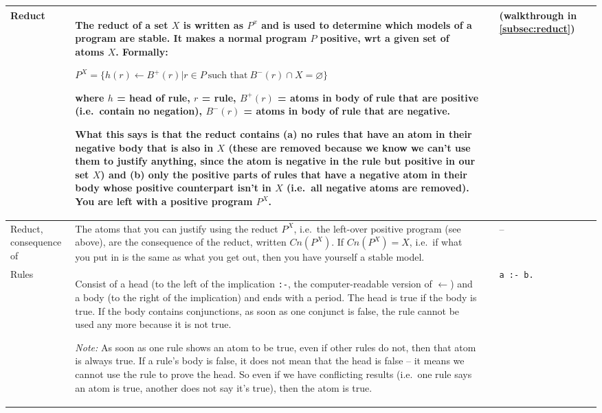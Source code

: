 \documentclass[9pt,a4paper,landscape]{article}
\begin{document}
{\begin{longtable}{Lp{14.5cm}lXX}
Reduct
& The reduct of a set $X$ is written as $P^x$ and is used to determine which models of a program are stable.
It makes a normal program $P$ positive, wrt a given set of atoms $X$.
Formally:
\begin{center}
	$P^X = \{h(r) \leftarrow B^+(r) | r \in P\ \text{such that}\ B^-(r) \cap X = \varnothing \}$
\end{center}
where $h$ = head of rule, $r$ = rule, $B^+(r)$ = atoms in body of rule that are positive (i.e.\ contain no negation), $B^-(r)$ = atoms in body of rule that are negative. \newline

What this says is that the reduct contains (a) no rules that have an atom in their negative body that is also in $X$ (these are removed because we know we can't use them to justify anything, since the atom is negative in the rule but positive in our set $X$) and (b) only the positive parts of rules that have a negative atom in their body whose positive counterpart isn't in $X$ (i.e.\ all negative atoms are removed).
You are left with a positive program $P^X$. \newline

&& (walkthrough in \ref{subsec:reduct}) &\\ \midrule

Reduct, consequence of
& The atoms that you can justify using the reduct $P^X$, i.e.\ the left-over positive program (see above), are the consequence of the reduct, written $Cn(P^X)$.
If $Cn(P^X) = X$, i.e.\ if what you put in is the same as what you get out, then you have yourself a stable model.
&& -- &\\ \midrule


Rules
& Consist of a head (to the left of the implication \texttt{:-}, the computer-readable version of $\leftarrow$) and a body (to the right of the implication) and ends with a period.
The head is true if the body is true.
If the body contains conjunctions, as soon as one conjunct is false, the rule cannot be used any more because it is not true. \newline

\textit{Note:} As soon as one rule shows an atom to be true, even if other rules do not, then that atom is always true. 
If a rule's body is false, it does not mean that the head is false -- it means we cannot use the rule to prove the head.
So even if we have conflicting results (i.e.\ one rule says an atom is true, another does not say it's true), then the atom is true.
&& \texttt{a :- b.} &\\ \midrule


\end{longtable}}
\end{document}
